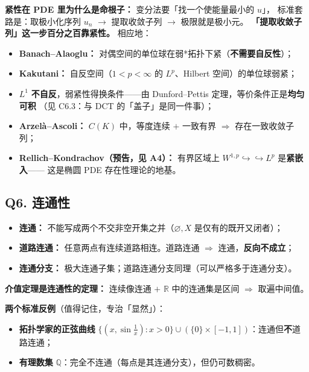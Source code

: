 \textbf{紧性在 PDE 里为什么是命根子：} 变分法要「找一个使能量最小的 $u$」，
标准套路是：取极小化序列 $u_n$ $\to$ 提取收敛子列 $\to$ 极限就是极小元。
\textbf{「提取收敛子列」这一步百分之百靠紧性。} 相应地：
\begin{itemize}
  \item \textbf{Banach--Alaoglu：} 对偶空间的单位球在弱*拓扑下紧（\textbf{不需要自反性}）；
  \item \textbf{Kakutani：} 自反空间（$1<p<\infty$ 的 $L^p$、Hilbert 空间）的单位球弱紧；
  \item $L^1$ \textbf{不自反}，弱紧性得换条件——由 Dunford--Pettis 定理，等价条件正是\textbf{均匀可积}
        （见 C6.3：与 DCT 的「盖子」是同一件事）；
  \item \textbf{Arzelà--Ascoli：} $C(K)$ 中，等度连续 $+$ 一致有界 $\Longrightarrow$ 存在一致收敛子列；
  \item \textbf{Rellich--Kondrachov（预告，见 A4）：} 有界区域上 $W^{1,p}\hookrightarrow\hookrightarrow L^p$ 是\textbf{紧嵌入}——
        这是椭圆 PDE 存在性理论的地基。
\end{itemize}

\subsection{Q6. 连通性}

\begin{itemize}
  \item \textbf{连通：} 不能写成两个不交非空开集之并（$\varnothing,X$ 是仅有的既开又闭者）；
  \item \textbf{道路连通：} 任意两点有连续道路相连。道路连通 $\Longrightarrow$ 连通，\textbf{反向不成立}；
  \item \textbf{连通分支：} 极大连通子集；道路连通分支同理（可以严格多于连通分支）。
\end{itemize}

\textbf{介值定理是连通性的定理：} 连续像连通 $+$ $\mathbb R$ 中的连通集是区间 $\Rightarrow$ 取遍中间值。

\textbf{两个标准反例}（值得记住，专治「显然」）：
\begin{itemize}
  \item \textbf{拓扑学家的正弦曲线} $\{(x,\sin\frac1x):x>0\}\cup(\{0\}\times[-1,1])$：连通但\textbf{不}道路连通；
  \item \textbf{有理数集} $\mathbb Q$：完全不连通（每点是其连通分支），但仍可数稠密。
\end{itemize}

